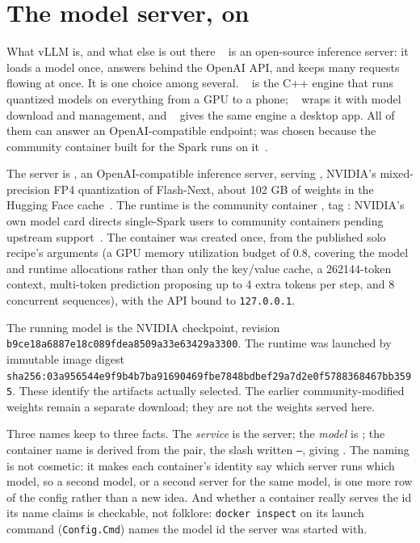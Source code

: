 \documentclass[11pt,a4paper]{article}
\begin{document}
\section{The model server, on }

\begin{insight}{What vLLM is, and what else is out there}
~\cite{vllm} is an open-source inference server: it loads a model once, answers behind the OpenAI API, and keeps many requests flowing at once. It is one choice among several. ~\cite{llama} is the C++ engine that runs quantized models on everything from a GPU to a phone; ~\cite{oll} wraps it with model download and management, and ~\cite{lms} gives the same engine a desktop app. All of them can answer an OpenAI-compatible endpoint;  was chosen because the community container built for the Spark runs on it~\cite{eug}.
\end{insight}

The server is , an OpenAI-compatible inference server, serving , NVIDIA's mixed-precision FP4 quantization of Flash-Next, about 102 GB of weights in the Hugging Face cache~\cite{nv}. The runtime is the community container , tag : NVIDIA's own model card directs single-Spark users to community containers pending upstream support~\cite{nv}. The container was created once, from the published solo recipe's arguments (a GPU memory utilization budget of 0.8, covering the model and runtime allocations rather than only the key/value cache, a 262144-token context, multi-token prediction proposing up to 4 extra tokens per step, and 8 concurrent sequences), with the API bound to \texttt{127.0.0.1}.

 The running model is the NVIDIA checkpoint, revision \nolinkurl{b9ce18a6887e18c089fdea8509a33e63429a3300}. The runtime was launched by immutable image digest \nolinkurl{sha256:03a956544e9f9b4b7ba91690469fbe7848bdbef29a7d2e0f5788368467bb3595}. These identify the artifacts actually selected. The earlier community-modified weights remain a separate download; they are not the weights served here.

Three names keep to three facts. The \emph{service} is the  server; the \emph{model} is ; the container name is derived from the pair, the slash written \texttt{--}, giving . The naming is not cosmetic: it makes each container's identity say which server runs which model, so a second model, or a second server for the same model, is one more row of the config rather than a new idea. And whether a container really serves the id its name claims is checkable, not folklore: \texttt{docker inspect} on its launch command (\texttt{Config.Cmd}) names the model id the server was started with.
\end{document}
